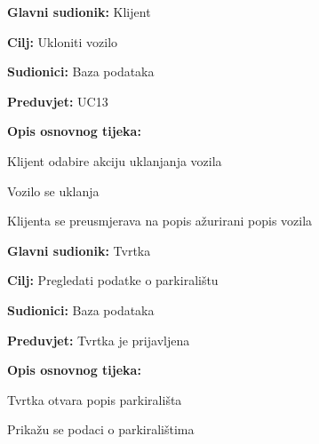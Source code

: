 \noindent {}
\begin{packed_item}
	
	\item \textbf{Glavni sudionik:} Klijent
	\item \textbf{Cilj:} Ukloniti vozilo
	\item \textbf{Sudionici:} Baza podataka
	\item \textbf{Preduvjet:} UC13
	\item \textbf{Opis osnovnog tijeka:}
	
	\item[] \begin{packed_enum}
		
		\item Klijent odabire akciju uklanjanja vozila
		\item Vozilo se uklanja
		\item Klijenta se preusmjerava na popis ažurirani popis vozila

	\end{packed_enum}
\end{packed_item}

\pagebreak

\noindent {}
\begin{packed_item}
	
	\item \textbf{Glavni sudionik: } Tvrtka
	\item \textbf{Cilj:} Pregledati podatke o parkiralištu
	\item \textbf{Sudionici:} Baza podataka
	\item \textbf{Preduvjet:} Tvrtka je prijavljena
	\item \textbf{Opis osnovnog tijeka:}
	
	\item[] \begin{packed_enum}
		
		\item Tvrtka otvara popis parkirališta 
		\item Prikažu se podaci o parkiralištima
	
	\end{packed_enum}
\end{packed_item}

